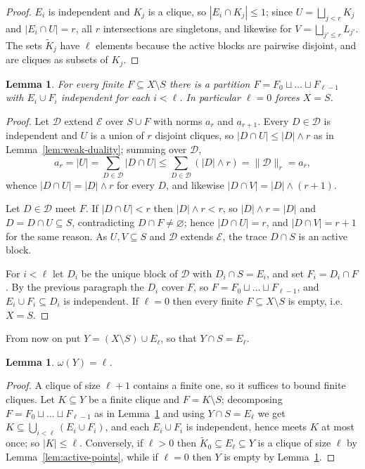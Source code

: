 \documentclass[11pt,reqno]{amsart}
\theoremstyle{plain}
\newtheorem{lemma}[theorem]{Lemma}
\theoremstyle{definition}
\theoremstyle{remark}
\newcommand{\cl}{\omega}
\begin{document}
\begin{proof}
$E_i$ is independent and $K_j$ is a clique, so $|E_i\cap K_j|\le1$; since
$U=\bigsqcup_{j<r}K_j$ and $|E_i\cap U|=r$, all $r$ intersections are
singletons, and likewise for $V=\bigsqcup_{j'\le r}L_{j'}$. The sets
$\widetilde K_j$ have $\ell$ elements because the active blocks are pairwise
disjoint, and are cliques as subsets of $K_j$.
\end{proof}

\begin{lemma}
\label{lem:active-decomposition}
For every finite $F\subseteq X\setminus S$ there is a partition
$F=F_0\sqcup\dots\sqcup F_{\ell-1}$ with $E_i\cup F_i$ independent for each
$i<\ell$. In particular $\ell=0$ forces $X=S$.
\end{lemma}

\begin{proof}
Let $\mathcal D$ extend $\mathcal E$ over $S\cup F$ with norms $a_r$ and
$a_{r+1}$. Every $D\in\mathcal D$ is independent and $U$ is a union of $r$
disjoint cliques, so $|D\cap U|\le|D|\wedge r$ as in
Lemma~\ref{lem:weak-duality}; summing over $\mathcal D$,
\[
a_r=|U|=\sum_{D\in\mathcal D}|D\cap U|
\le\sum_{D\in\mathcal D}(|D|\wedge r)=\lVert\mathcal D\rVert_r=a_r,
\]
whence $|D\cap U|=|D|\wedge r$ for every $D$, and likewise
$|D\cap V|=|D|\wedge(r+1)$.

Let $D\in\mathcal D$ meet $F$. If $|D\cap U|<r$ then $|D|\wedge r<r$, so
$|D|\wedge r=|D|$ and $D=D\cap U\subseteq S$, contradicting
$D\cap F\neq\varnothing$; hence $|D\cap U|=r$, and $|D\cap V|=r+1$ for the same
reason. As $U,V\subseteq S$ and $\mathcal D$ extends $\mathcal E$, the trace
$D\cap S$ is an active block.

For $i<\ell$ let $D_i$ be the unique block of $\mathcal D$ with
$D_i\cap S=E_i$, and set $F_i=D_i\cap F$. By the previous paragraph the $D_i$
cover $F$, so $F=F_0\sqcup\dots\sqcup F_{\ell-1}$, and
$E_i\cup F_i\subseteq D_i$ is independent. If $\ell=0$ then every finite
$F\subseteq X\setminus S$ is empty, i.e.\ $X=S$.
\end{proof}

From now on put $Y=(X\setminus S)\cup E_{\ell}$, so that
$Y\cap S=E_{\ell}$.

\begin{lemma}
\label{lem:clique-number}
$\cl(Y)=\ell$.
\end{lemma}

\begin{proof}
A clique of size $\ell+1$ contains a finite one, so it suffices to bound
finite cliques. Let $K\subseteq Y$ be a finite clique and $F=K\setminus S$;
decomposing $F=F_0\sqcup\dots\sqcup F_{\ell-1}$ as in
Lemma~\ref{lem:active-decomposition} and using $Y\cap S=E_{\ell}$ we get
$K\subseteq\bigcup_{i<\ell}(E_i\cup F_i)$, and each $E_i\cup F_i$ is
independent, hence meets $K$ at most once; so $|K|\le\ell$. Conversely, if
$\ell>0$ then $\widetilde K_0\subseteq E_{\ell}\subseteq Y$ is a clique of
size $\ell$ by Lemma~\ref{lem:active-points}, while if $\ell=0$ then $Y$ is
empty by Lemma~\ref{lem:active-decomposition}.
\end{proof}
\end{document}
